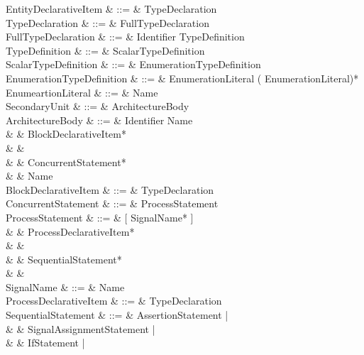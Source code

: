 \begin{VHDLcode}[\footnotesize]
  EntityDeclarativeItem & ::= & TypeDeclaration \\
  TypeDeclaration & ::= & FullTypeDeclaration \\
  FullTypeDeclaration & ::= & \VHDLTYPE{} Identifier \VHDLIS{} TypeDefinition \VHDLSemicolon \\
  TypeDefinition & ::= & ScalarTypeDefinition \\
  ScalarTypeDefinition & ::= & EnumerationTypeDefinition \\
  EnumerationTypeDefinition & ::= & \VHDLOpenBracket{} EnumerationLiteral (\VHDLComma{} EnumerationLiteral)* \VHDLCloseBracket{} \\
  EnumeartionLiteral & ::= & Name \\
  SecondaryUnit & ::= & ArchitectureBody \\
  ArchitectureBody & ::= & \VHDLARCHITECTURE{} Identifier \VHDLOF{} Name \VHDLIS \\
                              &      & \VHDLTab BlockDeclarativeItem* \\
                              &      & \VHDLBEGIN \\
                              &      & \VHDLTab ConcurrentStatement* \\
                              &      & \VHDLEND{} Name \VHDLSemicolon \\
  BlockDeclarativeItem & ::= & TypeDeclaration \\
  ConcurrentStatement & ::= & ProcessStatement \\
  ProcessStatement & ::= & \VHDLPROCESS{} [\VHDLOpenBracket{} SignalName* \VHDLCloseBracket{}] \VHDLIS \\
                               &      & \VHDLTab ProcessDeclarativeItem* \\
                               &      & \VHDLBEGIN \\
                               &      & \VHDLTab SequentialStatement* \\
                               &      & \VHDLEND{} \VHDLPROCESS \\
  SignalName & ::= & Name \\
  ProcessDeclarativeItem & ::= & TypeDeclaration \\
  SequentialStatement & ::= & AssertionStatement | \\
                                   &       & SignalAssignmentStatement | \\
                                   &       & IfStatement | \\

\end{VHDLcode}
